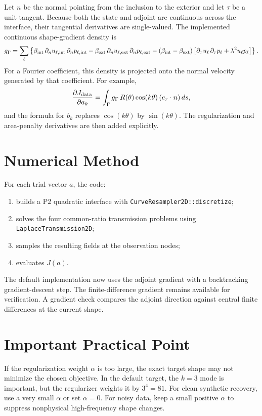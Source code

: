 \documentclass[11pt]{article}
\begin{document}
Let $n$ be the normal pointing from the inclusion to the exterior and let
$\tau$ be a unit tangent.  Because both the state and adjoint are continuous
across the interface, their tangential derivatives are single-valued.  The
implemented continuous shape-gradient density is
\[
    g_\Gamma
    =
    \sum_\ell
    \left\{
    \beta_{\rm int}\,\partial_n u_{\ell,{\rm int}}\,
        \partial_n p_{\ell,{\rm int}}
    -
    \beta_{\rm ext}\,\partial_n u_{\ell,{\rm ext}}\,
        \partial_n p_{\ell,{\rm ext}}
    -
    (\beta_{\rm int}-\beta_{\rm ext})
    \left[
        \partial_\tau u_\ell\,\partial_\tau p_\ell
        + \lambda^2 u_\ell p_\ell
    \right]
    \right\}.
\]
For a Fourier coefficient, this density is projected onto the normal velocity
generated by that coefficient.  For example,
\[
    \frac{\partial J_{\rm data}}{\partial a_k}
    =
    \int_\Gamma
    g_\Gamma\,
    R(\theta)\cos(k\theta)\,
    (e_r\cdot n)\,ds,
\]
and the formula for $b_k$ replaces $\cos(k\theta)$ by $\sin(k\theta)$.  The
regularization and area-penalty derivatives are then added explicitly.

\section*{Numerical Method}

For each trial vector $a$, the code:
\begin{enumerate}
    \item builds a P2 quadratic interface with
          \texttt{CurveResampler2D::discretize};
    \item solves the four common-ratio transmission problems using
          \texttt{LaplaceTransmission2D};
    \item samples the resulting fields at the observation nodes;
    \item evaluates $J(a)$.
\end{enumerate}
The default implementation now uses the adjoint gradient with a backtracking
gradient-descent step.  The finite-difference gradient remains available for
verification.  A gradient check compares the adjoint direction against central
finite differences at the current shape.

\section*{Important Practical Point}

If the regularization weight $\alpha$ is too large, the exact target shape may
not minimize the chosen objective.  In the default target, the $k=3$ mode is
important, but the regularizer weights it by $3^4=81$.  For clean synthetic
recovery, use a very small $\alpha$ or set $\alpha=0$.  For noisy data, keep a
small positive $\alpha$ to suppress nonphysical high-frequency shape changes.
\end{document}
